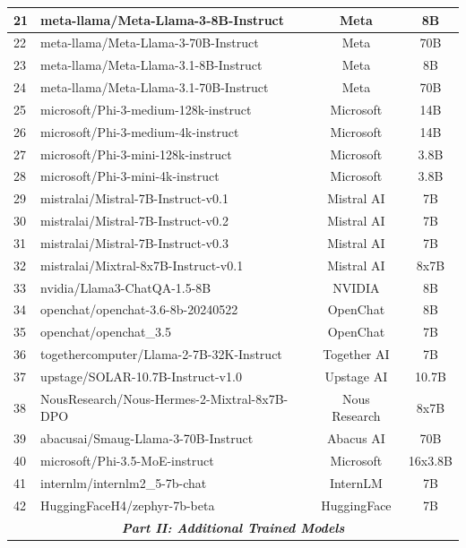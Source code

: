 \documentclass[letterpaper,twocolumn,10pt]{article}
\begin{document}
\begin{table}[t]
{\begin{tabular}{llcc}
21 & meta-llama/Meta-Llama-3-8B-Instruct & Meta & 8B \\ \hline
22 & meta-llama/Meta-Llama-3-70B-Instruct & Meta & 70B \\ \hline
23 & meta-llama/Meta-Llama-3.1-8B-Instruct & Meta & 8B \\ \hline
24 & meta-llama/Meta-Llama-3.1-70B-Instruct & Meta & 70B \\ \hline
25 & microsoft/Phi-3-medium-128k-instruct & Microsoft & 14B \\ \hline
26 & microsoft/Phi-3-medium-4k-instruct & Microsoft & 14B \\ \hline
27 & microsoft/Phi-3-mini-128k-instruct & Microsoft & 3.8B \\ \hline
28 & microsoft/Phi-3-mini-4k-instruct & Microsoft & 3.8B \\ \hline
29 & mistralai/Mistral-7B-Instruct-v0.1 & Mistral AI & 7B \\ \hline
30 & mistralai/Mistral-7B-Instruct-v0.2 & Mistral AI & 7B \\ \hline
31 & mistralai/Mistral-7B-Instruct-v0.3 & Mistral AI & 7B \\ \hline
32 & mistralai/Mixtral-8x7B-Instruct-v0.1  & Mistral AI & 8x7B \\ \hline
33 & nvidia/Llama3-ChatQA-1.5-8B & NVIDIA  & 8B \\ \hline
34 & openchat/openchat-3.6-8b-20240522 & OpenChat & 8B \\ \hline
35 & openchat/openchat\_3.5 & OpenChat & 7B \\ \hline
36 & togethercomputer/Llama-2-7B-32K-Instruct & Together AI & 7B \\ \hline
37 & upstage/SOLAR-10.7B-Instruct-v1.0 & Upstage AI & 10.7B \\ \hline
38 & NousResearch/Nous-Hermes-2-Mixtral-8x7B-DPO & Nous Research & 8x7B \\ \hline
39 & abacusai/Smaug-Llama-3-70B-Instruct  & Abacus AI & 70B \\ \hline
40 & microsoft/Phi-3.5-MoE-instruct & Microsoft & 16x3.8B \\ \hline
41 & internlm/internlm2\_5-7b-chat & InternLM & 7B \\ \hline
42 & HuggingFaceH4/zephyr-7b-beta & HuggingFace & 7B \\ 

\midrule
\multicolumn{4}{c}{\textit{\textbf{Part II: Additional Trained Models}}} \\
\midrule


\end{tabular}}
\end{table}
\end{document}
